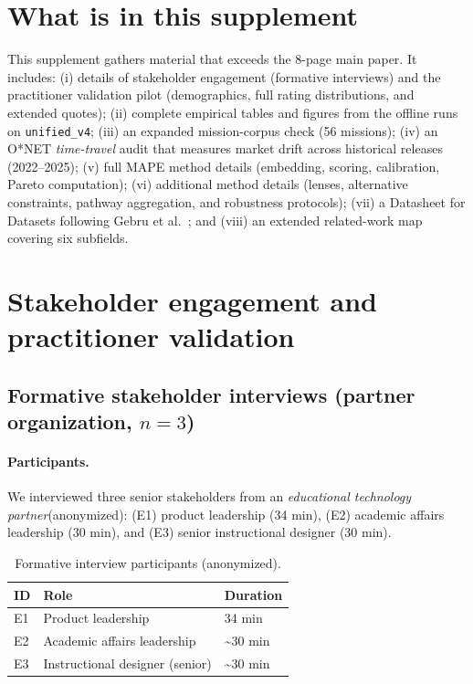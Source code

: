 \documentclass[sigconf,review]{acmart}
\newcommand{\MAPE}{\textsc{MAPE}\xspace}
\newcommand{\IndustryPartner}{\textit{educational technology partner}}
\begin{document}

\newpage
\appendix

\renewcommand{\thetable}{S\arabic{table}}
\renewcommand{\thefigure}{S\arabic{figure}}
\setcounter{table}{0}
\setcounter{figure}{0}


\section{What is in this supplement}
This supplement gathers material that exceeds the 8-page main paper. It includes:
(i) details of stakeholder engagement (formative interviews) and the practitioner validation pilot (demographics, full rating distributions, and extended quotes);
(ii) complete empirical tables and figures from the offline runs on \texttt{unified\_v4};
(iii) an expanded mission-corpus check (56 missions);
(iv) an O*NET \emph{time-travel} audit that measures market drift across historical releases (2022--2025);
(v) full \MAPE method details (embedding, scoring, calibration, Pareto computation);
(vi) additional method details (lenses, alternative constraints, pathway aggregation, and robustness protocols);
(vii) a Datasheet for Datasets following Gebru et al.~\cite{gebru2021datasheets}; and
(viii) an extended related-work map covering six subfields.


\section{Stakeholder engagement and practitioner validation}
\label{sec:supp-stakeholder}

\subsection{Formative stakeholder interviews (partner organization, $n{=}3$)}
\paragraph{Participants.} We interviewed three senior stakeholders from an \IndustryPartner (anonymized):
(E1) product leadership (34 min),
(E2) academic affairs leadership (30 min), and
(E3) senior instructional designer (30 min).

\begin{table}[h]
\centering
\small
\caption{Formative interview participants (anonymized).}
\label{tab:expert-participants}
\begin{tabular}{@{}lll@{}}
\toprule
ID & Role & Duration\\
\midrule
E1 & Product leadership & 34 min\\
E2 & Academic affairs leadership & \textasciitilde 30 min\\
E3 & Instructional designer (senior) & \textasciitilde 30 min\\
\bottomrule
\end{tabular}
\end{table}
\end{document}
